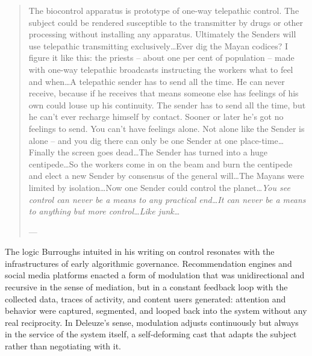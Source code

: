\begin{quote}
	The biocontrol apparatus is prototype of one-way telepathic control. The subject could be rendered susceptible to the transmitter by drugs or other processing without installing any apparatus. Ultimately the Senders will use telepathic transmitting exclusively\ldots Ever dig the Mayan codices? I figure it like this: the priests -- about one per cent of population -- made with one-way telepathic broadcasts instructing the workers what to feel and when\ldots A telepathic sender has to send all the time. He can never receive, because if he receives that means someone else has feelings of his own could louse up his continuity. The sender has to send all the time, but he can't ever recharge himself by contact. Sooner or later he's got no feelings to send. You can't have feelings alone. Not alone like the Sender is alone -- and you dig there can only be one Sender at one place-time\ldots Finally the screen goes dead\ldots The Sender has turned into a huge centipede\ldots So the workers come in on the beam and burn the centipede and elect a new Sender by consensus of the general will\ldots The Mayans were limited by isolation\ldots Now one Sender could control the planet\ldots \textit{You see control can never be a means to any practical end\ldots It can never be a means to anything but more control\ldots Like junk\ldots}

	— \cite[81]{burroughs1979}
\end{quote}


The logic Burroughs intuited in his writing on control resonates with the infrastructures of early algorithmic governance. Recommendation engines and social media platforms enacted a form of modulation that was unidirectional and recursive in the sense of mediation, but in a constant feedback loop with the collected data, traces of activity, and content users generated: attention and behavior were captured, segmented, and looped back into the system without any real reciprocity. In Deleuze's sense, modulation adjusts continuously but always in the service of the system itself, a self-deforming cast that adapts the subject rather than negotiating with it.

